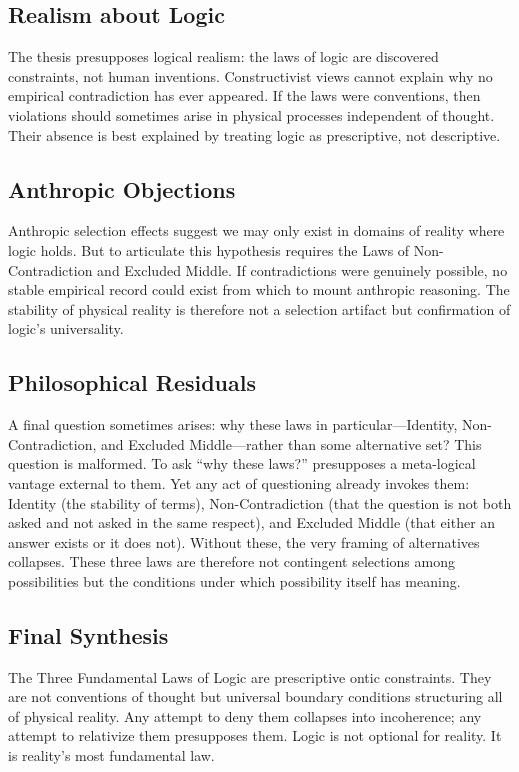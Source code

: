 \documentclass[12pt]{article}
\begin{document}
\subsection*{Realism about Logic}
The thesis presupposes logical realism: the laws of logic are discovered constraints, not human inventions. Constructivist views cannot explain why no empirical contradiction has ever appeared. If the laws were conventions, then violations should sometimes arise in physical processes independent of thought. Their absence is best explained by treating logic as prescriptive, not descriptive.

\subsection*{Anthropic Objections}
Anthropic selection effects suggest we may only exist in domains of reality where logic holds. But to articulate this hypothesis requires the Laws of Non-Contradiction and Excluded Middle. If contradictions were genuinely possible, no stable empirical record could exist from which to mount anthropic reasoning. The stability of physical reality is therefore not a selection artifact but confirmation of logic’s universality.

\subsection*{Philosophical Residuals}
A final question sometimes arises: why these laws in particular---Identity, Non-Contradiction, and Excluded Middle---rather than some alternative set? This question is malformed. To ask ``why these laws?'' presupposes a meta-logical vantage external to them. Yet any act of questioning already invokes them: Identity (the stability of terms), Non-Contradiction (that the question is not both asked and not asked in the same respect), and Excluded Middle (that either an answer exists or it does not). Without these, the very framing of alternatives collapses. These three laws are therefore not contingent selections among possibilities but the conditions under which possibility itself has meaning.

\subsection*{Final Synthesis}
The Three Fundamental Laws of Logic are prescriptive ontic constraints. They are not conventions of thought but universal boundary conditions structuring all of physical reality. Any attempt to deny them collapses into incoherence; any attempt to relativize them presupposes them. Logic is not optional for reality. It is reality’s most fundamental law.
\end{document}

